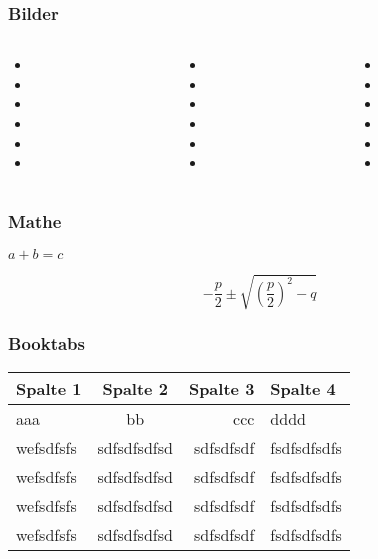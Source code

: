 \documentclass{beamer}
\begin{document}
\begin{frame}
\frametitle{Bilder}

\begin{columns}
\begin{column}{0.33\textwidth}
\begin{itemize}
	\item 
	\item 
	\item 
	\item 
	\item 
	\item 
	\end{itemize}
\end{column}
\begin{column}{0.33\textwidth}
\begin{itemize}
	\item 
	\item 
	\item 
	\item 
	\item 
	\item 
	\end{itemize}
\end{column}
\begin{column}{0.33\textwidth}
\begin{itemize}
	\item 
	\item 
	\item 
	\item 
	\item 
	\item 
	\end{itemize}
\end{column}
\end{columns}
\end{frame}

\begin{frame}
\frametitle{Mathe}

\(a+b=c\)

\[-\frac{p}{2} \pm \sqrt{ \left(\frac{p}{2}\right)^2 -q  }\]


\end{frame}

\begin{frame}
\frametitle{Booktabs}

\begin{tabular}{|l|c|r|p{4cm}|} \hline
Spalte 1 & Spalte 2 & Spalte 3 & Spalte 4 \\ \hline
aaa & bb & ccc & dddd \\ \hline
wefsdfsfs & sdfsdfsdfsd & sdfsdfsdf & fsdfsdfsdfs\\ \hline
wefsdfsfs & sdfsdfsdfsd & sdfsdfsdf & fsdfsdfsdfs\\ \hline
wefsdfsfs & sdfsdfsdfsd & sdfsdfsdf & fsdfsdfsdfs\\ \hline
wefsdfsfs & sdfsdfsdfsd & sdfsdfsdf & fsdfsdfsdfs\\ \hline
\end{tabular}

\end{frame}
\end{document}

